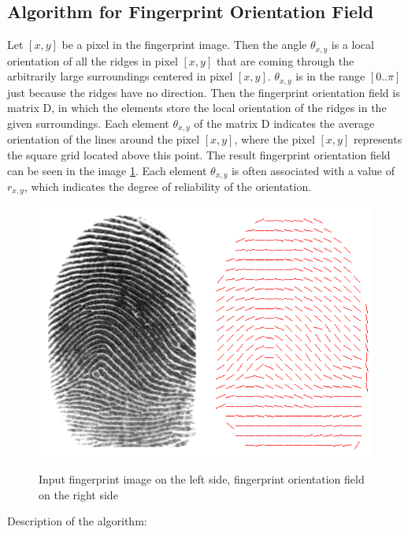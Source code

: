 \subsection{Algorithm for Fingerprint Orientation Field} \label{oricomp}
Let $[x, y]$ be a pixel in the fingerprint image. Then the angle $\theta_{x,y}$ is a local orientation of all the ridges in pixel $[x, y]$ that are coming through the arbitrarily large surroundings centered in pixel $[x, y]$. $\theta_{x,y}$ is in the range $[0..\pi]$ just because the ridges have no direction. Then the fingerprint orientation field is matrix D, in which the elements store the local orientation of the ridges in the given surroundings. Each element $ \theta_{x, y} $ of the matrix D indicates the average orientation of the lines around the pixel $[x, y]$, where the pixel $[x, y]$ represents the square grid located above this point. The result fingerprint orientation field can be seen in the image \ref{fig:ori_img}. Each element $ \theta_{x, y} $ is often associated with a value of $ r_{x, y} $, which indicates the degree of reliability of the orientation. \cite{ori}

\begin{figure}[H]
    \centering
        {\includegraphics[width=0.5\linewidth]{obrazky-figures/ori_navrh.png}}\\
        \caption{Input fingerprint image on the left side, fingerprint orientation field on the right side}
        \label{fig:ori_img}
\end{figure}

Description of the algorithm:

